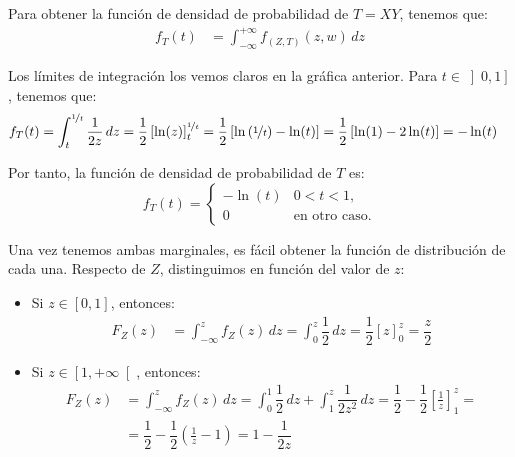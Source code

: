 \begin{ejercicio}
\begin{enumerate}
        Para obtener la función de densidad de probabilidad de $T=XY$, tenemos que:
        \begin{align*}
            f_{T}(t)&=\int_{-\infty}^{+\infty} f_{(Z,T)}(z, w) \, dz
        \end{align*}

        Los límites de integración los vemos claros en la gráfica anterior. Para $t\in \left]0,1\right]$, tenemos que:
        \begin{align*}
            f_T(t)&=\int_{t}^{\nicefrac{1}{t}} \dfrac{1}{2z} \, dz = \dfrac{1}{2}\left[\ln(z)\right]_{t}^{\nicefrac{1}{t}} = \dfrac{1}{2}\left[\ln\left(\nicefrac{1}{t}\right)-\ln(t)\right]
            = \dfrac{1}{2}\left[\ln(1)-2\ln(t)\right] = -\ln(t)
        \end{align*}

        Por tanto, la función de densidad de probabilidad de $T$ es:
        \begin{equation*}
            f_T(t) = \begin{cases}
                -\ln(t) & 0<t<1, \\
                0 & \text{en otro caso}.
            \end{cases}
        \end{equation*}

        Una vez tenemos ambas marginales, es fácil obtener la función de distribución de cada una.
        Respecto de $Z$, distinguimos en función del valor de $z$:
        \begin{itemize}
            \item Si $z\in [0,1]$, entonces:
            \begin{align*}
                F_Z(z)&=\int_{-\infty}^{z} f_Z(z) \, dz = \int_{0}^{z} \dfrac{1}{2} \, dz = \dfrac{1}{2}\left[z\right]_{0}^{z} = \dfrac{z}{2}
            \end{align*}

            \item Si $z\in \left[1,+\infty\right[$, entonces:
            \begin{align*}
                F_Z(z)&=\int_{-\infty}^{z} f_Z(z) \, dz = \int_{0}^{1} \dfrac{1}{2} \, dz + \int_{1}^{z} \dfrac{1}{2z^2} \, dz
                = \dfrac{1}{2} - \dfrac{1}{2}\left[\frac{1}{z}\right]_{1}^{z}
                =\\&= \dfrac{1}{2} - \dfrac{1}{2}\left(\frac{1}{z}-1\right)
                = 1-\dfrac{1}{2z}
            \end{align*}        
        \end{itemize}


\end{enumerate}
\end{ejercicio}
